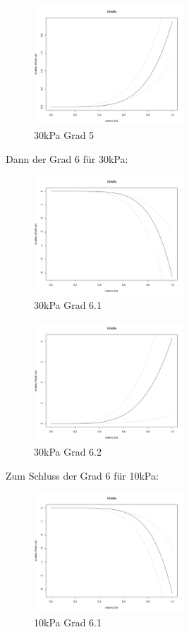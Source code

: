 \documentclass[12pt,a4paper]{article}
\theoremstyle{definition}
\theoremstyle{definition}
\theoremstyle{definition}
\begin{document}
\begin{figure}[H] 
  \centering
     \includegraphics[width=0.5\textwidth]{30kPa-Grad-5-KB}
  \caption{30kPa Grad 5}
  \label{30kPa Grad 5}
\end{figure}

Dann der Grad 6 für 30kPa:

\begin{figure}[H] 
  \centering
     \includegraphics[width=0.5\textwidth]{30kPa-Grad-6-1-KB}
  \caption{30kPa Grad 6.1}
  \label{30kPa Grad 6.1}
\end{figure}

\begin{figure}[H] 
  \centering
     \includegraphics[width=0.5\textwidth]{30kPa-Grad-6-2-KB}
  \caption{30kPa Grad 6.2}
  \label{30kPa Grad 6.2}
\end{figure}

Zum Schluss der Grad 6 für 10kPa:

\begin{figure}[H] 
  \centering
     \includegraphics[width=0.5\textwidth]{10kPa-Grad-6-1-KB}
  \caption{10kPa Grad 6.1}
  \label{10kPa Grad 6.1}
\end{figure}
\end{document}
